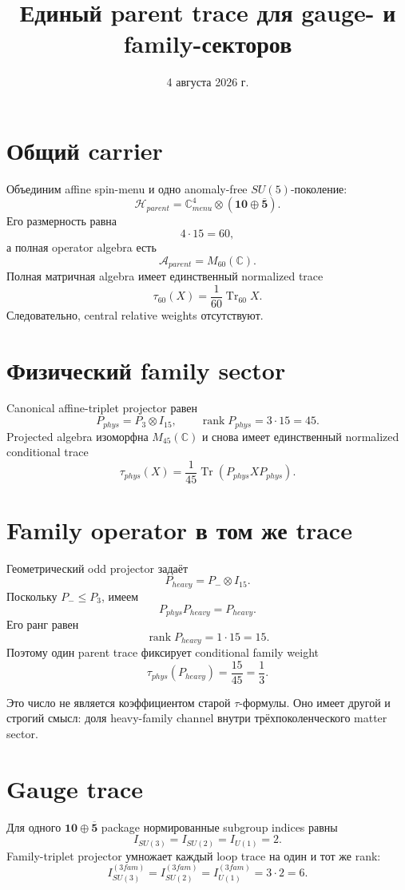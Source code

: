 \documentclass[12pt,a4paper]{article}
\title{Единый parent trace для gauge- и family-секторов}
\author{}
\date{4 августа 2026 г.}
\begin{document}
\maketitle

\section{Общий carrier}

Объединим affine spin-menu и одно anomaly-free \(SU(5)\)-поколение:
\[
\mathcal H_{parent}
=\mathbb C^4_{menu}
\otimes
\left(\mathbf{10}\oplus\overline{\mathbf5}\right).
\]
Его размерность равна
\[
4\cdot15=60,
\]
а полная operator algebra есть
\[
\mathcal A_{parent}=M_{60}(\mathbb C).
\]
Полная матричная algebra имеет единственный normalized trace
\[
\tau_{60}(X)=\frac1{60}\operatorname{Tr}_{60}X.
\]
Следовательно, central relative weights отсутствуют.

\section{Физический family sector}

Canonical affine-triplet projector равен
\[
P_{phys}=P_3\otimes I_{15},
\qquad
\operatorname{rank}P_{phys}=3\cdot15=45.
\]
Projected algebra изоморфна \(M_{45}(\mathbb C)\) и снова имеет единственный normalized conditional trace
\[
\tau_{phys}(X)
=\frac1{45}\operatorname{Tr}(P_{phys}XP_{phys}).
\]

\section{Family operator в том же trace}

Геометрический odd projector задаёт
\[
P_{heavy}=P_-\otimes I_{15}.
\]
Поскольку \(P_-\leq P_3\), имеем
\[
P_{phys}P_{heavy}=P_{heavy}.
\]
Его ранг равен
\[
\operatorname{rank}P_{heavy}=1\cdot15=15.
\]
Поэтому один parent trace фиксирует conditional family weight
\[
\tau_{phys}(P_{heavy})
=\frac{15}{45}
=\frac13.
\]

Это число не является коэффициентом старой \(\tau\)-формулы. Оно имеет другой и строгий смысл: доля heavy-family channel внутри трёхпоколенческого matter sector.

\section{Gauge trace}

Для одного \(\mathbf{10}\oplus\overline{\mathbf5}\) package нормированные subgroup indices равны
\[
I_{SU(3)}=I_{SU(2)}=I_{U(1)}=2.
\]
Family-triplet projector умножает каждый loop trace на один и тот же rank:
\[
I_{SU(3)}^{(3fam)}
=I_{SU(2)}^{(3fam)}
=I_{U(1)}^{(3fam)}
=3\cdot2=6.
\]
\end{document}
